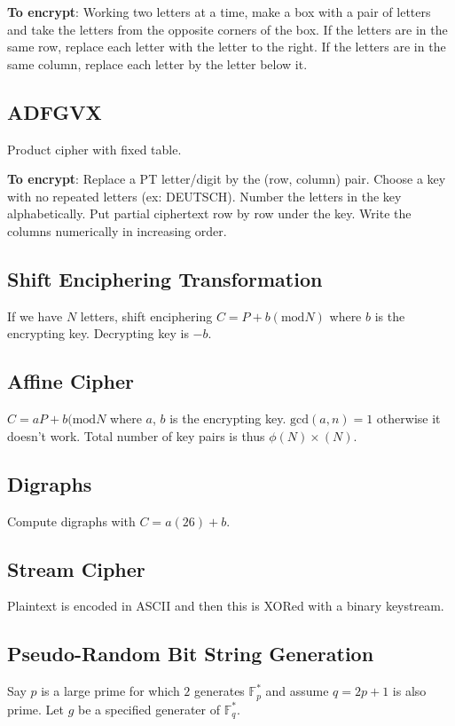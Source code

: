 \documentclass{article}
\begin{document}
\textbf{To encrypt}: Working two letters at a time, make a box with a pair of
letters and take the letters from the opposite corners of the box. If the
letters are in the same row, replace each letter with the letter to the right.
If the letters are in the same column, replace each letter by the letter below
it.

\subsection{ADFGVX}
Product cipher with fixed table.

\textbf{To encrypt}: Replace a PT letter/digit by the (row, column) pair.
Choose a key with no repeated letters (ex: DEUTSCH). Number the letters in the
key alphabetically. Put partial ciphertext row by row under the key. Write the
columns numerically in increasing order.

\subsection{Shift Enciphering Transformation}
If we have $N$ letters, shift enciphering $C = P + b (\text{mod} N)$ where $b$
is the encrypting key. Decrypting key is $-b$.

\subsection{Affine Cipher}
$C = aP + b (\text{mod} N$ where $a$, $b$ is the encrypting key.
$\text{gcd}(a,n) = 1$ otherwise it doesn't work. Total number of key pairs is
thus $\phi(N) \times (N)$.

\subsection{Digraphs}
Compute digraphs with $C = a(26) + b$.

\subsection{Stream Cipher}
Plaintext is encoded in ASCII and then this is XORed with a binary keystream.

\subsection{Pseudo-Random Bit String Generation}
Say $p$ is a large prime for which $2$ generates $\mathbb{F}_p^*$ and assume
$q=2p+1$ is also prime. Let $g$ be a specified generater of $\mathbb{F}_q^*$.
\end{document}

